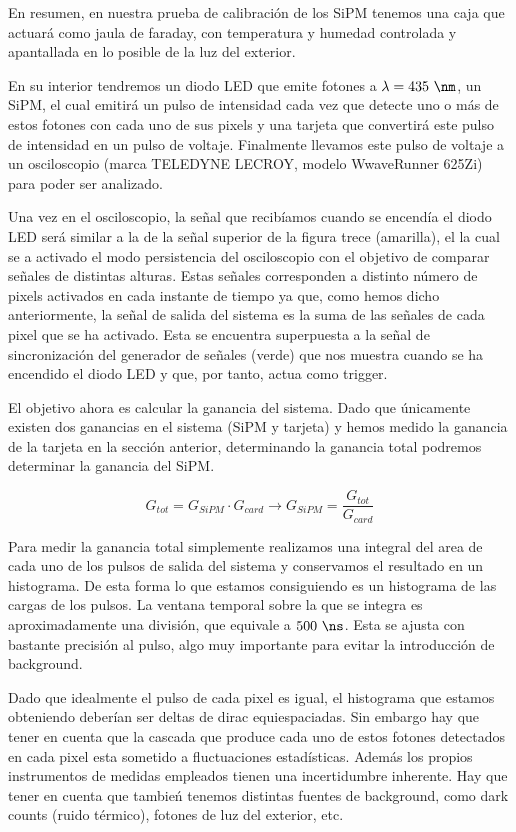 En resumen, en nuestra prueba de calibración de los SiPM tenemos una caja que actuará como jaula de faraday, con temperatura y humedad controlada y apantallada en lo posible de la luz del exterior. 

En su interior tendremos un diodo LED que emite fotones a $\lambda=435~\nm$, un SiPM, el cual emitirá un pulso de intensidad cada vez que detecte uno o más de estos fotones con cada uno de sus pixels y una tarjeta que convertirá este pulso de intensidad en un pulso de voltaje. Finalmente llevamos este pulso de voltaje a un osciloscopio (marca TELEDYNE LECROY, modelo WwaveRunner 625Zi) para poder ser analizado. 

Una vez en el osciloscopio, la señal que recibíamos cuando se encendía el diodo LED será similar a la de la señal superior de la figura trece (amarilla), el la cual se a activado el modo persistencia del osciloscopio con el objetivo de comparar señales de distintas alturas. Estas señales corresponden a distinto número de pixels activados en cada instante de tiempo ya que, como hemos dicho anteriormente, la señal de salida del sistema es la suma de las señales de cada pixel que se ha activado. Esta se encuentra superpuesta a la señal de sincronización del generador de señales (verde) que nos muestra cuando se ha encendido el diodo LED y que, por tanto, actua como trigger.

El objetivo ahora es calcular la ganancia del sistema. Dado que únicamente existen dos ganancias en el sistema (SiPM y tarjeta) y hemos medido la ganancia de la tarjeta en la sección anterior, determinando la ganancia total podremos determinar la ganancia del SiPM. 

\begin{equation}
G_{tot}=G_{SiPM} \cdotp G_{card} \longrightarrow G_{SiPM} = \frac{G_{tot}}{G_{card}}
\label{ganancias}
\end{equation}

Para medir la ganancia total simplemente realizamos una integral del area de cada uno de los pulsos de salida del sistema y conservamos el resultado en un histograma. De esta forma lo que estamos consiguiendo es un histograma de las cargas de los pulsos. La ventana temporal sobre la que se integra es aproximadamente una división, que equivale a $500~\ns$. Esta se ajusta con bastante precisión al pulso, algo muy importante para evitar la introducción de background.

Dado que idealmente el pulso de cada pixel es igual, el histograma que estamos obteniendo deberían ser deltas de dirac equiespaciadas. Sin embargo hay que tener en cuenta que la cascada que produce cada uno de estos fotones detectados en cada pixel esta sometido a fluctuaciones estadísticas. Además los propios instrumentos de medidas empleados tienen una incertidumbre inherente. Hay que tener en cuenta que tambień tenemos distintas fuentes de background, como dark counts (ruido térmico), fotones de luz del exterior, etc. 

